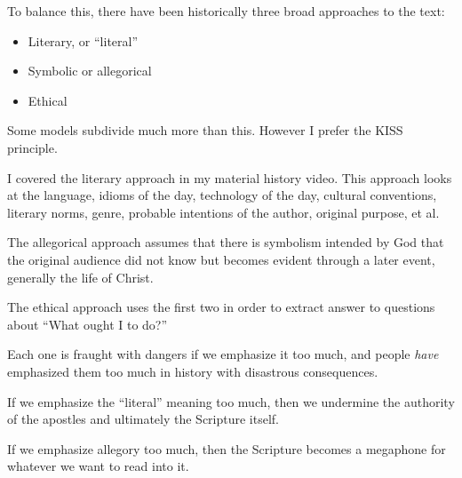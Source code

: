 \documentclass{beamer}
\begin{document}
\begin{frame}
  To balance this, there have been historically three broad approaches to the text:\pause
  \begin{itemize}
	\item Literary, or ``literal''\pause
	\item Symbolic or allegorical\pause
	\item Ethical
  \end{itemize}
\end{frame}

\begin{frame}
  Some models subdivide much more than this.
  However I prefer the KISS principle.
\end{frame}

\begin{frame}
  I covered the literary approach in my material history video.
  This approach looks at the language, idioms of the day, technology of the day, cultural conventions, literary norms, genre, probable intentions of the author, original purpose, et al.
\end{frame}

\begin{frame}
  The allegorical approach assumes that there is symbolism intended by God that the original audience did not know but becomes evident through a later event, generally the life of Christ.
\end{frame}

\begin{frame}
  The ethical approach uses the first two in order to extract answer to questions about ``What ought I to do?''
\end{frame}

\begin{frame}
  Each one is fraught with dangers if we emphasize it too much, and people \emph{have} emphasized them too much in history with disastrous consequences.
\end{frame}

\begin{frame}
  If we emphasize the ``literal'' meaning too much, then we undermine the authority of the apostles and ultimately the Scripture itself.
\end{frame}

\begin{frame}
  If we emphasize allegory too much, then the Scripture becomes a megaphone for whatever we want to read into it.
\end{frame}
\end{document}
